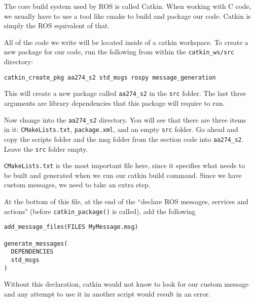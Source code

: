 The core build system used by ROS is called Catkin. When working with C code, we usually have to use a tool like cmake to build and package our code. Catkin is simply the ROS equivalent of that. 

All of the code we write will be located inside of a catkin workspace. To create a new package for our code, run the following from within the \texttt{catkin\_ws/src} directory:

\begin{lstlisting}
catkin_create_pkg aa274_s2 std_msgs rospy message_generation
\end{lstlisting}

This will create a new package called \texttt{aa274\_s2} in the \texttt{src} folder. The last three arguments are library dependencies that this package will require to run.

Now change into the \texttt{aa274\_s2} directory. You will see that there are three items in it: \texttt{CMakeLists.txt}, \texttt{package.xml}, and an empty \texttt{src} folder. Go ahead and copy the scripts folder and the msg folder from the section code into \texttt{aa274\_s2}. Leave the \texttt{src} folder empty.


\texttt{CMakeLists.txt} is the most important file here, since it specifies what needs to be built and generated when we run our catkin build command. Since we have custom messages, we need to take an extra step.

At the bottom of this file, at the end of the ``declare ROS messages, services and actions" (before \texttt{catkin\_package()} is called), add the following

\begin{lstlisting}
add_message_files(FILES MyMessage.msg)

generate_messages(
  DEPENDENCIES
  std_msgs
)
\end{lstlisting}

Without this declaration, catkin would not know to look for our custom message and any attempt to use it in another script would result in an error.

